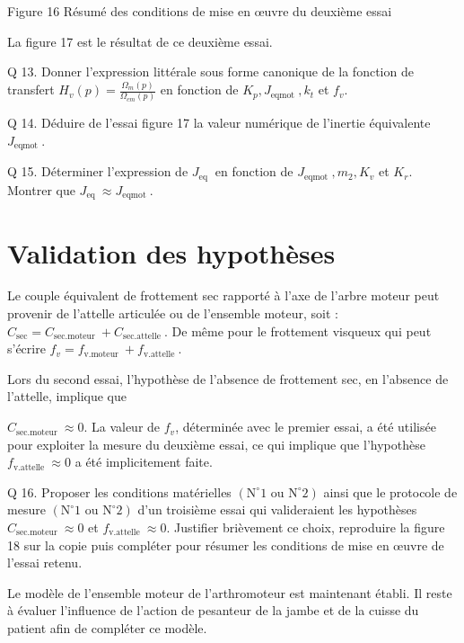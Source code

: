 \documentclass[10pt]{article}
\begin{document}
Figure 16 Résumé des conditions de mise en œuvre du deuxième essai

La figure 17 est le résultat de ce deuxième essai.

Q 13. Donner l'expression littérale sous forme canonique de la fonction de transfert $H_{v}(p)=\frac{\Omega_{m}(p)}{\Omega_{c m}(p)}$ en fonction de $K_{p}, J_{\text {eqmot }}, k_{t}$ et $f_{v}$.

Q 14. Déduire de l'essai figure 17 la valeur numérique de l'inertie équivalente $J_{\text {eqmot }}$.

Q 15. Déterminer l'expression de $J_{\text {eq }}$ en fonction de $J_{\text {eqmot }}, m_{2}, K_{v}$ et $K_{r}$. Montrer que $J_{\text {eq }} \approx J_{\text {eqmot }}$.

\section*{Validation des hypothèses}
Le couple équivalent de frottement sec rapporté à l'axe de l'arbre moteur peut provenir de l'attelle articulée ou de l'ensemble moteur, soit : $C_{\mathrm{sec}}=C_{\text {sec.moteur }}+C_{\text {sec.attelle }}$. De même pour le frottement visqueux qui peut s'écrire $f_{v}=f_{\text {v.moteur }}+f_{\text {v.attelle }}$.

Lors du second essai, l'hypothèse de l'absence de frottement sec, en l'absence de l'attelle, implique que

$C_{\text {sec.moteur }} \approx 0$. La valeur de $f_{v}$, déterminée avec le premier essai, a été utilisée pour exploiter la mesure du deuxième essai, ce qui implique que l'hypothèse $f_{\text {v.attelle }} \approx 0$ a été implicitement faite.

Q 16. Proposer les conditions matérielles $\left(\mathrm{N}^{\circ} 1\right.$ ou $\left.\mathrm{N}^{\circ} 2\right)$ ainsi que le protocole de mesure $\left(\mathrm{N}^{\circ} 1\right.$ ou $\left.\mathrm{N}^{\circ} 2\right)$ d'un troisième essai qui valideraient les hypothèses $C_{\text {sec.moteur }} \approx 0$ et $f_{\text {v.attelle }} \approx 0$. Justifier brièvement ce choix, reproduire la figure 18 sur la copie puis compléter pour résumer les conditions de mise en œuvre de l'essai retenu.

Le modèle de l'ensemble moteur de l'arthromoteur est maintenant établi. Il reste à évaluer l'influence de l'action de pesanteur de la jambe et de la cuisse du patient afin de compléter ce modèle.
\end{document}
